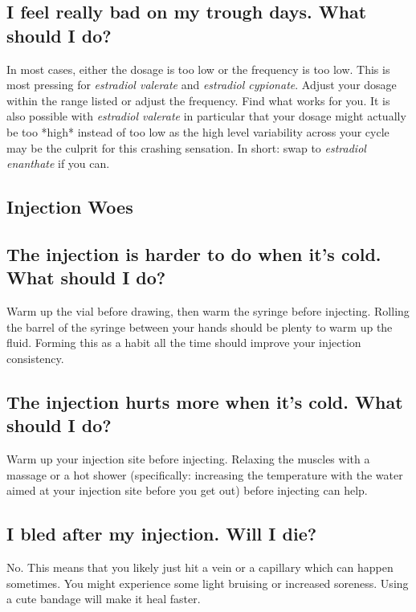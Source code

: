 \documentclass{article}
\begin{document}
\subsection{I feel really bad on my trough days. What should I do?}\label{7-3}

In most cases, either the dosage is too low or the frequency is too low. This is most pressing for \textit{estradiol valerate} and \textit{estradiol cypionate}. Adjust your dosage within the range listed or adjust the frequency. Find what works for you. It is also possible with \textit{estradiol valerate} in particular that your dosage might actually be too *high* instead of too low as the high level variability across your cycle may be the culprit for this crashing sensation. In short: swap to \textit{estradiol enanthate} if you can.

\subsection*{Injection Woes}

\subsection{The injection is harder to do when it’s cold. What should I do?}

Warm up the vial before drawing, then warm the syringe before injecting. Rolling the barrel of the syringe between your hands should be plenty to warm up the fluid. Forming this as a habit all the time should improve your injection consistency.

\subsection{The injection hurts more when it’s cold. What should I do?}

Warm up your injection site before injecting. Relaxing the muscles with a massage or a hot shower (specifically: increasing the temperature with the water aimed at your injection site before you get out) before injecting can help.

\subsection{I bled after my injection. Will I die?}

No. This means that you likely just hit a vein or a capillary which can happen sometimes. You might experience some light bruising or increased soreness. Using a cute bandage will make it heal faster.
\end{document}
